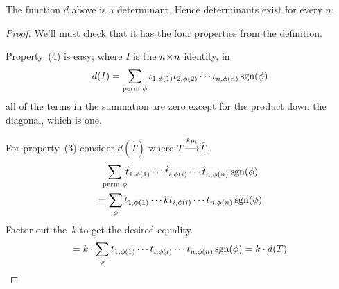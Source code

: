 \begin{lemma}
The function \( d \) above is a determinant.
Hence determinants exist for every $n$.
\end{lemma}

\begin{proof}
We'll must check that it has the four properties
from the definition.

Property~(4) is easy; where $I$ is the $n \! \times \! n$ identity, in
\begin{equation*}
  d(I)=
  \sum_{\text{perm\ }\phi}
    \iota_{1,\phi(1)}\iota_{2,\phi(2)}\cdots \iota_{n,\phi(n)}
                                 \operatorname{sgn}(\phi)
\end{equation*}
all of the terms in the summation are zero
except for the product down the diagonal,
which is one.

For property~(3) consider $d(\hat{T})$ where 
\( T\smash[b]{\mathrel{ \mathop{\longrightarrow}\limits^{k\rho_i\mathstrut}_{ \begin{subarray}{l} \relax \end{subarray}}}}\hat{T} \).
\begin{multline*}
  \sum_{\text{perm\ }\phi}\!\!
    \hat{t}_{1,\phi(1)}
     \cdots\hat{t}_{i,\phi(i)}\cdots\hat{t}_{n,\phi(n)}
                                 \operatorname{sgn}(\phi)   \\
  =\sum_{\phi}
     t_{1,\phi(1)}\cdots kt_{i,\phi(i)}\cdots t_{n,\phi(n)}
                                 \operatorname{sgn}(\phi)
\end{multline*}
Factor out the~\( k \) to get the desired equality.
\begin{equation*}
  =k\cdot\sum_{\phi}
     t_{1,\phi(1)}\cdots t_{i,\phi(i)}\cdots t_{n,\phi(n)}
                                 \operatorname{sgn}(\phi)                 
  =k\cdot d(T)
\end{equation*}


\end{proof}
